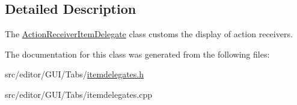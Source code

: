 \subsection{\-Detailed \-Description}
\-The \hyperlink{class_action_receiver_item_delegate}{\-Action\-Receiver\-Item\-Delegate} class customs the display of action receivers. 

\-The documentation for this class was generated from the following files\-:\begin{DoxyCompactItemize}
\item 
src/editor/\-G\-U\-I/\-Tabs/\hyperlink{itemdelegates_8h}{itemdelegates.\-h}\item 
src/editor/\-G\-U\-I/\-Tabs/itemdelegates.\-cpp\end{DoxyCompactItemize}
